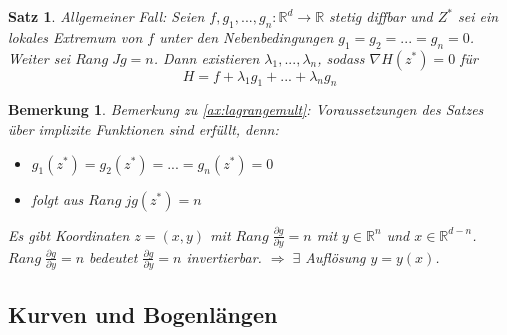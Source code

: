 \documentclass[12pt,a4paper]{report}%
\newtheorem{satz}{Satz}[section]
\newtheorem{bem}{Bemerkung}[section]
\numberwithin{equation}{section}
\newcommand{\R}{\mathbb{R}} %
\newcommand{\diffp}{\partial}
\numberwithin{equation}{subsection}
\begin{document}
  \begin{satz}
    Allgemeiner Fall: Seien $f,g_1,...,g_n : \R^d \rightarrow \R$ stetig diffbar und $Z^*$ sei ein lokales Extremum von $f$ unter den Nebenbedingungen $g_1 = g_2 = ... = g_n = 0$. Weiter sei $Rang\;Jg = n$. Dann existieren $\lambda_1,...,\lambda_n$, sodass $\nabla H(z^*) = 0$ für 
    \begin{equation}
      H = f + \lambda_1g_1 + ... + \lambda_n g_n
    \end{equation}\label{ax:lagrangemult}
  \end{satz}
  \begin{bem}
    Bemerkung zu \eqref{ax:lagrangemult}: Voraussetzungen des Satzes über implizite Funktionen sind erfüllt, denn:
    \begin{itemize}
      \item[V1) ] $g_1(z^*) = g_2(z^*) = ... = g_n(z^*) = 0$
      \item[V2) ] folgt aus $Rang\; jg(z^*) = n$
    \end{itemize}
    Es gibt Koordinaten $z = (x,y)$ mit $Rang \; \frac{\diffp g}{\diffp y} = n$ mit $y \in \R^n$ und $x \in \R^{d-n}$. $Rang \; \frac{\diffp g}{\diffp y} = n$ bedeutet $\frac{\diffp g}{\diffp y} = n$ invertierbar. \newline
    $\Rightarrow \; \exists$ Auflösung $y = y(x)$.
  \end{bem}
  
  \subsection{Kurven und Bogenlängen}
\end{document}

